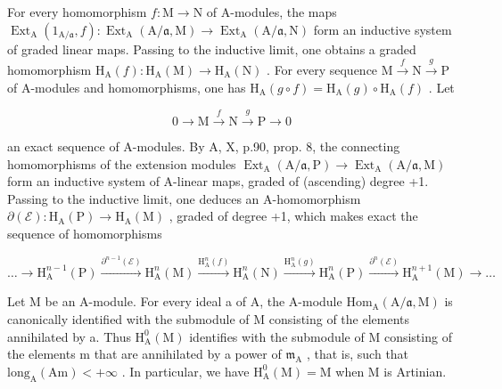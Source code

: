 For every homomorphism \(f: \mathrm{M} \to \mathrm{N}\) of A-modules, the maps \(\operatorname{Ext}_{\mathrm{A}}(1_{\mathrm{A}/\mathfrak{a}}, f): \operatorname{Ext}_{\mathrm{A}}(\mathrm{A}/\mathfrak{a}, \mathrm{M}) \longrightarrow \operatorname{Ext}_{\mathrm{A}}(\mathrm{A}/\mathfrak{a}, \mathrm{N})\) form an inductive system of graded linear maps. Passing to the inductive limit, one obtains a graded homomorphism \(\mathrm{H}_{\mathrm{A}}(f): \mathrm{H}_{\mathrm{A}}(\mathrm{M}) \to \mathrm{H}_{\mathrm{A}}(\mathrm{N})\) . For every sequence \(\mathrm{M} \xrightarrow{f} \mathrm{N} \xrightarrow{g} \mathrm{P}\) of A-modules and homomorphisms, one has \(\mathrm{H}_{\mathrm{A}}(g \circ f) = \mathrm{H}_{\mathrm{A}}(g) \circ \mathrm{H}_{\mathrm{A}}(f)\) . Let

\[
0 \longrightarrow \mathrm{M} \stackrel {f} {\longrightarrow} \mathrm{N} \stackrel {g} {\longrightarrow} \mathrm{P} \longrightarrow 0\tag{ℰ}
\]

an exact sequence of A-modules. By A, X, p.90, prop. 8, the connecting homomorphisms of the extension modules \(\operatorname{Ext}_{\mathrm{A}}(\mathrm{A}/\mathfrak{a},\mathrm{P}) \longrightarrow \operatorname{Ext}_{\mathrm{A}}(\mathrm{A}/\mathfrak{a},\mathrm{M})\) form an inductive system of A-linear maps, graded of (ascending) degree +1. Passing to the inductive limit, one deduces an A-homomorphism \(\partial(\mathcal{E}): \mathrm{H}_{\mathrm{A}}(\mathrm{P}) \to \mathrm{H}_{\mathrm{A}}(\mathrm{M})\) , graded of degree +1, which makes exact the sequence of homomorphisms

\[
\dots \longrightarrow \mathrm{H} _ {\mathrm{A}} ^ {n - 1} (\mathrm{P}) \xrightarrow {\partial^ {n - 1} (\mathcal {E})} \mathrm{H} _ {\mathrm{A}} ^ {n} (\mathrm{M}) \xrightarrow {\mathrm{H} _ {\mathrm{A}} ^ {n} (f)} \mathrm{H} _ {\mathrm{A}} ^ {n} (\mathrm{N}) \xrightarrow {\mathrm{H} _ {\mathrm{A}} ^ {n} (g)} \mathrm{H} _ {\mathrm{A}} ^ {n} (\mathrm{P}) \xrightarrow {\partial^ {n} (\mathcal {E})} \mathrm{H} _ {\mathrm{A}} ^ {n + 1} (\mathrm{M}) \longrightarrow \dots
\]

Let M be an A-module. For every ideal a of A, the A-module \(\mathrm{Hom}_{\mathrm{A}}(\mathrm{A}/\mathfrak{a},\mathrm{M})\) is canonically identified with the submodule of M consisting of the elements annihilated by a. Thus \(\mathrm{H}_{\mathrm{A}}^{0}(\mathrm{M})\) identifies with the submodule of M consisting of the elements m that are annihilated by a power of \(\mathfrak{m}_{\mathrm{A}}\) , that is, such that \(\mathrm{long}_{\mathrm{A}}(\mathrm{Am}) < +\infty\) . In particular, we have \(\mathrm{H}_{\mathrm{A}}^{0}(\mathrm{M}) = \mathrm{M}\) when M is Artinian.

